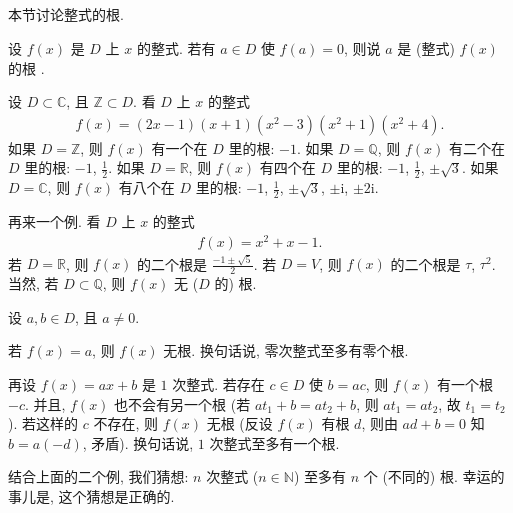 \subsection*{\RootsOfPolynomials}
\markright{\RootsOfPolynomials}

本节讨论整式的根.

\begin{definition}
    设 $f(x)$ 是 $D$ 上 $x$ 的整式. 若有 $a \in D$ 使 $f(a) = 0$, 则说 $a$ 是 (整式) $f(x)$ 的根 .
\end{definition}

\begin{example}
    设 $D \subset \mathbb{C}$, 且 $\mathbb{Z} \subset D$. 看 $D$ 上 $x$ 的整式
    \begin{align*}
        f(x) = (2x-1)(x+1)(x^2 - 3)(x^2 + 1)(x^2 + 4).
    \end{align*}
    如果 $D = \mathbb{Z}$, 则 $f(x)$ 有一个在 $D$ 里的根: $-1$. 如果 $D = \mathbb{Q}$, 则 $f(x)$ 有二个在 $D$ 里的根: $-1$, $\frac12$. 如果 $D = \mathbb{R}$, 则 $f(x)$ 有四个在 $D$ 里的根: $-1$, $\frac12$, $\pm \sqrt{3}$. 如果 $D = \mathbb{C}$, 则 $f(x)$ 有八个在 $D$ 里的根: $-1$, $\frac12$, $\pm \sqrt{3}$, $\pm \mathrm{i}$, $\pm 2\mathrm{i}$.
\end{example}

\begin{example}
    再来一个例. 看 $D$ 上 $x$ 的整式
    \begin{align*}
        f(x) = x^2 + x - 1.
    \end{align*}
    若 $D = \mathbb{R}$, 则 $f(x)$ 的二个根是 $\frac{-1 \pm \sqrt{5}}{2}$. 若 $D = V$, 则 $f(x)$ 的二个根是 $\tau$, $\tau^2$. 当然, 若 $D \subset \mathbb{Q}$, 则 $f(x)$ 无 ($D$ 的) 根.
\end{example}

\begin{remark}
    设 $a,b \in D$, 且 $a \neq 0$.

    若 $f(x) = a$, 则 $f(x)$ 无根. 换句话说, 零次整式至多有零个根.

    再设 $f(x) = ax + b$ 是 $1$ 次整式. 若存在 $c \in D$ 使 $b = ac$, 则 $f(x)$ 有一个根 $-c$. 并且, $f(x)$ 也不会有另一个根 (若 $at_1 + b = at_2 + b$, 则 $at_1 = at_2$, 故 $t_1 = t_2$). 若这样的 $c$ 不存在, 则 $f(x)$ 无根 (反设 $f(x)$ 有根 $d$, 则由 $ad + b = 0$ 知 $b = a(-d)$, 矛盾). 换句话说, $1$ 次整式至多有一个根.

    结合上面的二个例, 我们猜想: $n$ 次整式 ($n \in \mathbb{N}$) 至多有 $n$ 个 (不同的) 根. 幸运的事{\scriptsize 儿}是, 这个猜想是正确的.
\end{remark}

